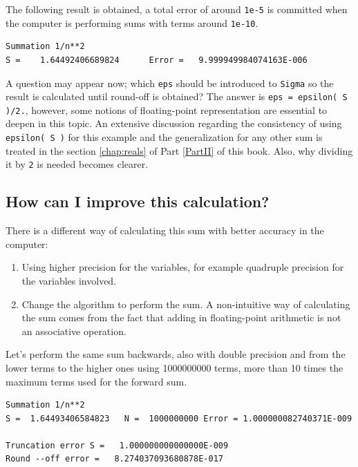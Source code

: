 The following result is obtained, a total error of around \texttt{1e-5} is committed
when the computer is performing sums with terms around \texttt{1e-10}.  

\begin{verbatim} 
Summation 1/n**2
S =    1.64492406689824      Error =   9.999949984074163E-006
\end{verbatim}

A question may appear now; which \texttt{eps} should be introduced to \texttt{Sigma} so the result is calculated until round-off is obtained?
The answer is \texttt{eps = epsilon( S )/2.}, however, some notions of floating-point representation are essential to deepen in this topic.
An extensive discussion regarding the consistency of using \texttt{epsilon( S )} for this example and the generalization for any other sum 
is treated in the section \ref{chap:reals} of Part \ref{PartII} of this book. Also, why dividing it by \texttt{2} is needed becomes clearer. 




 
    \subsection{How can I improve this calculation?}
    
There is a different way of calculating this sum with better accuracy in the computer:
\begin{enumerate}
    \item Using higher precision for the variables, for example quadruple precision for the variables involved. 
    \item Change the algorithm to perform the sum. A non-intuitive way of calculating the sum comes from the fact
    that adding in floating-point arithmetic is not an associative operation. 
\end{enumerate}

Let's perform the same sum backwards, also with double precision and from the lower terms to the higher ones using 1000000000 terms, more than 10 times the maximum terms
used for the forward sum. 

\begin{verbatim} 
Summation 1/n**2
S =  1.64493406584823   N =  1000000000 Error = 1.000000082740371E-009

Truncation error S =   1.000000000000000E-009
Round --off error =   8.274037093680878E-017
\end{verbatim}
 
